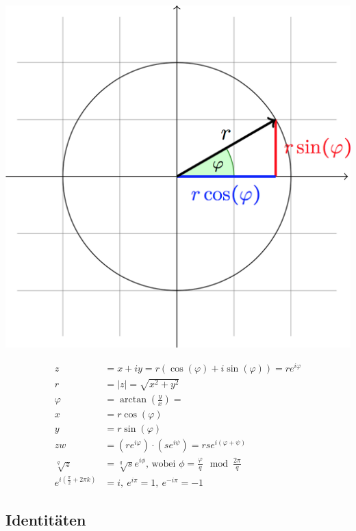 \documentclass[11pt]{article}
\begin{document}
\begin{minipage}[c]{0.5\textwidth}
\centering
\includegraphics[width=\linewidth,keepaspectratio=true]{images/polarform}
\end{minipage}
%
\begin{minipage}[c]{0.5\textwidth}
\begin{equation*}
\begin{split}
	z & = x + iy = r(\cos(\varphi) + i\sin(\varphi)) = re^{i\varphi} \\
	r & = |z| = \sqrt{x^2 + y^2} \\
	\varphi & = \arctan(\frac{y}{x}) =  \\
	x & = r\cos(\varphi) \\
	y & = r\sin(\varphi) \\
	zw & = (re^{i\varphi})\cdot(se^{i\psi}) = rse^{i(\varphi + \psi)} \\
	\sqrt[q]{z} & = \sqrt[q]{s}e^{i\phi}\text{, wobei }\phi = \frac{\varphi}{q} \mod \frac{2\pi}{q} \\
	e^{i(\frac{\pi}{2} + 2\pi k)} & = i,\ e^{i\pi} = 1, \ e^{-i\pi} = -1
\end{split}
\end{equation*}
\end{minipage}

\subsection{Identit{\"a}ten}
\end{document}
